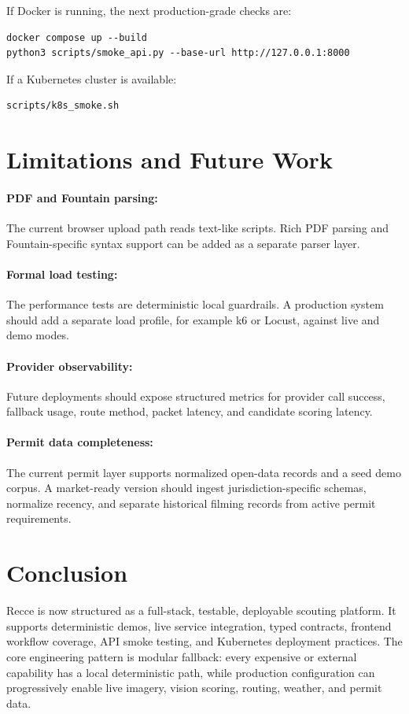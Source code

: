 \documentclass[11pt]{article}
\begin{document}
If Docker is running, the next production-grade checks are:

\begin{lstlisting}
docker compose up --build
python3 scripts/smoke_api.py --base-url http://127.0.0.1:8000
\end{lstlisting}

If a Kubernetes cluster is available:

\begin{lstlisting}
scripts/k8s_smoke.sh
\end{lstlisting}

\section{Limitations and Future Work}

\paragraph{PDF and Fountain parsing:}
The current browser upload path reads text-like scripts. Rich PDF parsing and
Fountain-specific syntax support can be added as a separate parser layer.

\paragraph{Formal load testing:}
The performance tests are deterministic local guardrails. A production system
should add a separate load profile, for example k6 or Locust, against live and
demo modes.

\paragraph{Provider observability:}
Future deployments should expose structured metrics for provider call success,
fallback usage, route method, packet latency, and candidate scoring latency.

\paragraph{Permit data completeness:}
The current permit layer supports normalized open-data records and a seed demo
corpus. A market-ready version should ingest jurisdiction-specific schemas,
normalize recency, and separate historical filming records from active permit
requirements.

\section{Conclusion}

Recce is now structured as a full-stack, testable, deployable scouting platform.
It supports deterministic demos, live service integration, typed contracts,
frontend workflow coverage, API smoke testing, and Kubernetes deployment
practices. The core engineering pattern is modular fallback: every expensive or
external capability has a local deterministic path, while production
configuration can progressively enable live imagery, vision scoring, routing,
weather, and permit data.
\end{document}
